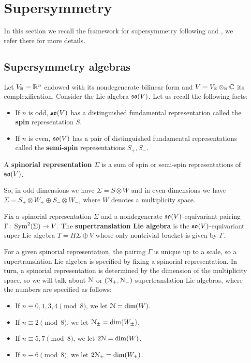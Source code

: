 \documentclass[10pt, oneside]{article}
\begin{document}
\section{Supersymmetry} \label{sec: susy}

In this section we recall the framework for supersymmetry following \cite{ElliottSafronov} and \cite{DeligneSpinors}, we refer there for more details.

\subsection{Supersymmetry algebras}

Let $V_\mathbb R = \mathbb R^n$ endowed with its nondegenerate bilinear form and $V=V_\mathbb R\otimes_\mathbb R\mathbb C$ its complexification. Consider the Lie algebra $\mathfrak{so}(V)$. Let us recall the following facts:
\begin{itemize}
\item If $n$ is odd, $\mathfrak{so}(V)$ has a distinguished fundamental representation called the {\bf spin} representation $S$.

\item If $n$ is even, $\mathfrak{so}(V)$ has a pair of distinguished fundamental representations called the {\bf semi-spin} representations $S_+, S_-$.
\end{itemize}

\begin{definition}
A {\bf spinorial representation} $\Sigma$ is a sum of spin or semi-spin representations of $\mathfrak{so}(V)$.
\end{definition}

So, in odd dimensions we have $\Sigma=S\otimes W$ and in even dimensions we have $\Sigma=S_+\otimes W_+\oplus S_-\otimes W_-$, where $W$ denotes a multiplicity space.

\begin{definition}
Fix a spinorial representation $\Sigma$ and a nondegenerate $\mathfrak{so}(V)$-equivariant pairing $\Gamma\colon \operatorname{Sym}^2(\Sigma)\rightarrow V$. The {\bf supertranslation Lie algebra} is the $\mathfrak{so}(V)$-equivariant super Lie algebra $T=\Pi\Sigma\oplus V$ whose only nontrivial bracket is given by $\Gamma$.
\end{definition}

For a given spinorial representation, the pairing $\Gamma$ is unique up to a scale, so a supertranslation Lie algebra is specified by fixing a spinorial representation. In turn, a spinorial representation is determined by the dimension of the multiplicity space, so we will talk about $\mathcal{N}$ or $(\mathcal{N}_+, \mathcal{N}_-)$ supertranslation Lie algebras, where the numbers are specified as follows:
\begin{itemize}
\item If $n\equiv 0, 1, 3, 4\pmod 8$, we let $\mathcal{N} = \dim(W)$.

\item If $n\equiv 2 \pmod 8$, we let $\mathcal{N}_{\pm}=\dim(W_{\pm})$.

\item If $n\equiv 5, 7\pmod 8$, we let $2\mathcal{N} = \dim(W)$.

\item If $n\equiv 6\pmod 8$, we let $2\mathcal{N}_{\pm} = \dim(W_{\pm})$.
\end{itemize}
\end{document}
